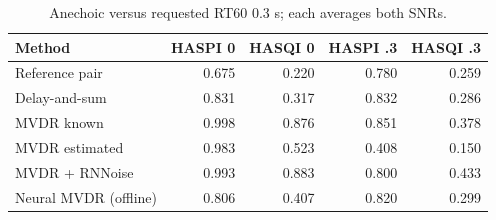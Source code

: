 \begin{table}[htbp]\centering\small
\caption{Anechoic versus requested RT60 0.3 s; each averages both SNRs.}
\begin{tabular}{lrrrr}\toprule
Method & HASPI 0 & HASQI 0 & HASPI .3 & HASQI .3 \\
\midrule
Reference pair & 0.675 & 0.220 & 0.780 & 0.259 \\
Delay-and-sum & 0.831 & 0.317 & 0.832 & 0.286 \\
MVDR known & 0.998 & 0.876 & 0.851 & 0.378 \\
MVDR estimated & 0.983 & 0.523 & 0.408 & 0.150 \\
MVDR + RNNoise & 0.993 & 0.883 & 0.800 & 0.433 \\
Neural MVDR (offline) & 0.806 & 0.407 & 0.820 & 0.299 \\
\bottomrule\end{tabular}\end{table}
